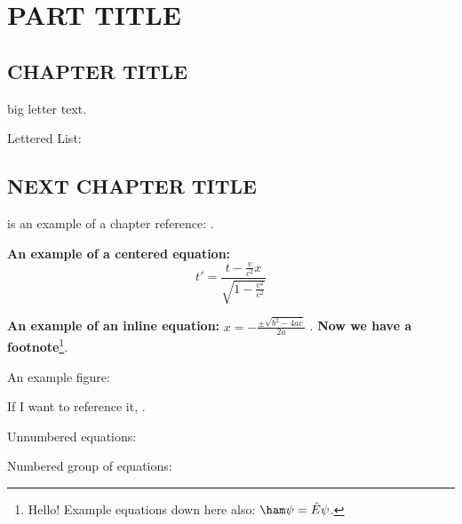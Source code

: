 \section{PART TITLE}

\subsection{CHAPTER TITLE} \label{sec:I}

 big letter text. \lipsum[5]

Lettered List:


\subsection{NEXT CHAPTER TITLE}

 is an example of a chapter reference: . \lipsum[1]

\lipsum[2-2] \textbf{An example of a centered equation:} \[
    t' = \frac{t - \frac{v}{c^2}x}{\sqrt{1 - \frac{v^2}{c^2}}}
\]

\lipsum[3-3] \textbf{An example of an inline equation:} $x = -\frac{\pm \sqrt{b^2 - 4ac}}{2a}$ \lipsum[4-4]. \textbf{Now we have a footnote}\footnote{Hello! Example equations down here also: $\ham \psi = \hat{E}\psi$.}.

An example figure: 

If I want to reference it, .

Unnumbered equations:

Numbered group of equations:

